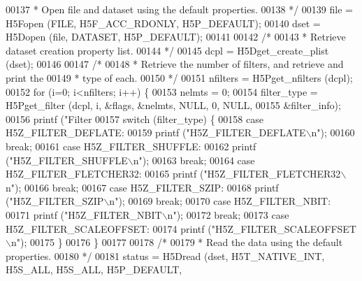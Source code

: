 \begin{DoxyCode}
00137 \textcolor{comment}{     * Open file and dataset using the default properties.}
00138 \textcolor{comment}{     */}
00139     file = H5Fopen (FILE, H5F\_ACC\_RDONLY, H5P\_DEFAULT);
00140     dset = H5Dopen (file, DATASET, H5P\_DEFAULT);
00141 
00142     \textcolor{comment}{/*}
00143 \textcolor{comment}{     * Retrieve dataset creation property list.}
00144 \textcolor{comment}{     */}
00145     dcpl = H5Dget\_create\_plist (dset);
00146 
00147     \textcolor{comment}{/*}
00148 \textcolor{comment}{     * Retrieve the number of filters, and retrieve and print the}
00149 \textcolor{comment}{     * type of each.}
00150 \textcolor{comment}{     */}
00151     nfilters = H5Pget\_nfilters (dcpl);
00152     \textcolor{keywordflow}{for} (i=0; i<nfilters; i++) \{
00153         nelmts = 0;
00154         filter\_type = H5Pget\_filter (dcpl, i, &flags, &nelmts, NULL, 0, NULL,
00155                     &filter\_info);
00156         printf (\textcolor{stringliteral}{"Filter %
00157         \textcolor{keywordflow}{switch} (filter\_type) \{
00158             \textcolor{keywordflow}{case} H5Z\_FILTER\_DEFLATE:
00159                 printf (\textcolor{stringliteral}{"H5Z\_FILTER\_DEFLATE\(\backslash\)n"});
00160                 \textcolor{keywordflow}{break};
00161             \textcolor{keywordflow}{case} H5Z\_FILTER\_SHUFFLE:
00162                 printf (\textcolor{stringliteral}{"H5Z\_FILTER\_SHUFFLE\(\backslash\)n"});
00163                 \textcolor{keywordflow}{break};
00164             \textcolor{keywordflow}{case} H5Z\_FILTER\_FLETCHER32:
00165                 printf (\textcolor{stringliteral}{"H5Z\_FILTER\_FLETCHER32\(\backslash\)n"});
00166                 \textcolor{keywordflow}{break};
00167             \textcolor{keywordflow}{case} H5Z\_FILTER\_SZIP:
00168                 printf (\textcolor{stringliteral}{"H5Z\_FILTER\_SZIP\(\backslash\)n"});
00169                 \textcolor{keywordflow}{break};
00170             \textcolor{keywordflow}{case} H5Z\_FILTER\_NBIT:
00171                 printf (\textcolor{stringliteral}{"H5Z\_FILTER\_NBIT\(\backslash\)n"});
00172                 \textcolor{keywordflow}{break};
00173             \textcolor{keywordflow}{case} H5Z\_FILTER\_SCALEOFFSET:
00174                 printf (\textcolor{stringliteral}{"H5Z\_FILTER\_SCALEOFFSET\(\backslash\)n"});
00175         \}
00176     \}
00177 
00178     \textcolor{comment}{/*}
00179 \textcolor{comment}{     * Read the data using the default properties.}
00180 \textcolor{comment}{     */}
00181     status = H5Dread (dset, H5T\_NATIVE\_INT, H5S\_ALL, H5S\_ALL, H5P\_DEFAULT,
}
\end{DoxyCode}
